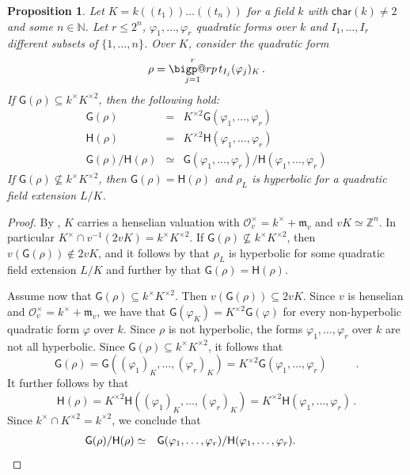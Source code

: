 \documentclass[twoside,11pt]{amsart}
\makeatletter
\numberwithin{equation}{section}
\newtheorem{prop}[equation]{Proposition}
\theoremstyle{definition}
\newcommand{\car}{\mathsf{char}}
\newcommand{\mg}[1]{{#1}^{\times}}
\newcommand{\sq}[1]{{#1}^{\times 2}}
\newcommand{\nat}{\mathbb{N}}
\renewcommand{\leq}{\leqslant}
\newcommand{\mc}{\mathcal}
\newcommand{\G}{\mathsf{G}}
\renewcommand{\H}{\mathsf{H}}
\renewcommand{\leq}{\leqslant}
\newcommand{\mf}{\mathfrak}
\newcommand{\mfm}{\mf{m}}
\newcommand{\zz}{\mathbb{Z}}
\newcommand{\bigperp}{%
  \mathop{\mathpalette\bigp@rp\relax}%
  \displaylimits
}
\newcommand{\bigp@rp}[2]{%
  \vcenter{
    \m@th\hbox{\scalebox{\ifx#1\displaystyle2.1\else1.5\fi}{$#1\perp$}}
  }%
}
\makeatother
\begin{document}
\begin{prop}\label{GH-glued-families}
    Let $K=k(\!(t_1)\!)\ldots(\!(t_n)\!)$ for a field $k$ with $\car(k)\neq 2$ and some $n\in\nat$.
    Let $r\leq 2^n$, $\varphi_1,\dots,\varphi_r$ quadratic forms over $k$ and $I_1,\dots,I_r$ different subsets of $\{1,\dots,n\}$.
    Over $K$, consider the quadratic form $$\rho=\bigperp_{j=1}^r t_{I_j}(\varphi_j)_K\,.$$
    If $\G(\rho)\subseteq \mg{k}\sq{K}$, then the following hold:
    \begin{eqnarray*}
    \G(\rho) & = & \sq{K}\G(\varphi_1,\ldots,\varphi_r)\\
    \H(\rho) & = & \sq{K} \H(\varphi_1,\ldots,\varphi_r)\\
    \G(\rho)/\H(\rho) & \simeq & \G(\varphi_1,\dots,\varphi_r)/\H(\varphi_1,\dots,\varphi_r)
    \end{eqnarray*}
    If $\G(\rho)\not\subseteq \mg{k}\sq{K}$, then $\G(\rho)=\H(\rho)$ and $\rho_L$ is hyperbolic for a quadratic field extension $L/K$. 
\end{prop}
\begin{proof}
By , $K$ carries a henselian valuation with $\mg{\mc{O}}_v=\mg{k}+\mfm_v$ and $vK\simeq \zz^n$. 
In particular $\mg{K}\cap v^{-1}(2vK)=\mg{k}\sq{K}$.
If $\G(\rho)\not\subseteq \mg{k}\sq{K}$, then $v(\G(\rho))\notin 2vK$, and it follows by  that $\rho_L$ is hyperbolic for some quadratic field  extension $L/K$ and further by
 that $\G(\rho)=\H(\rho)$.

Assume now that $\G(\rho)\subseteq \mg{k}\sq{K}$. Then $v(\G(\rho))\subseteq 2vK$.
Since $v$ is henselian and $\mg{\mc{O}}_v=\mg{k}+\mfm_v$, we have 
that $\G(\varphi_K)=\sq{K}\G(\varphi)$ for every non-hyperbolic quadratic form $\varphi$ over $k$.
Since $\rho$ is not hyperbolic, the forms $\varphi_1,\dots,\varphi_r$  over $k$ are not all hyperbolic.
Since $\G(\rho)\subseteq \mg{k}\sq{K}$, it follows that 
$$\G(\rho)=\G((\varphi_1)_K,\dots,(\varphi_r)_K)=\sq{K}\G(\varphi_1,\dots,\varphi_r)\hspace{1cm}\,.$$
It further follows by 
that $$\H(\rho)  = \sq{K} \H((\varphi_1)_K,\ldots,(\varphi_r)_K) = \sq{K} \H(\varphi_1,\ldots,\varphi_r)\,.$$
Since $\mg{k}\cap \sq{K}=\sq{k}$, we conclude that 
\begin{eqnarray*}
\hspace{2cm}\G(\rho)/\H(\rho) & \simeq & \G(\varphi_1,\dots,\varphi_r)/\H(\varphi_1,\dots,\varphi_r). \hspace{3cm}\qedhere
\end{eqnarray*}
\end{proof}
\end{document}
